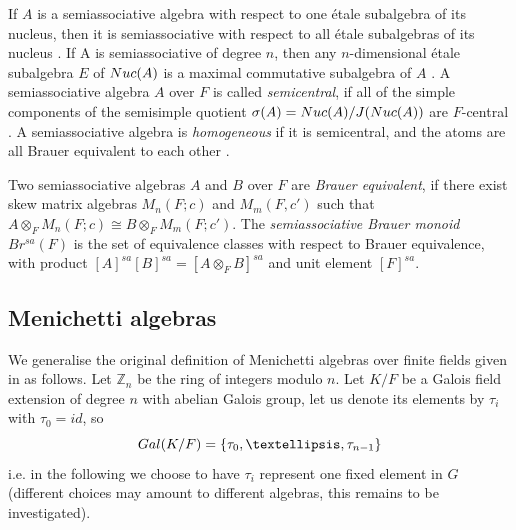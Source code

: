 \documentclass[11pt]{amsart}
\theoremstyle{plain}
\theoremstyle{definition}
\begin{document}
If $A$ is a
semiassociative algebra with respect to one \'etale subalgebra of its nucleus, then it is
 semiassociative
with respect to all \'etale subalgebras of its nucleus \cite[Proposition 3.6]{BHMRV}.
 If A is semiassociative of degree $n$, then any $n$-dimensional
\'etale subalgebra $E$ of ${\rm Nuc}(A)$ is a maximal commutative subalgebra of $A$ \cite[Corollary 7.3]{BHMRV}.
A semiassociative algebra $A$ over $F$ is called \emph{semicentral}, if all of the simple components of the semisimple quotient $\sigma(A)={\rm Nuc}(A)/J({\rm Nuc}(A))$ are $F$-central \cite[Definition 16.1]{BHMRV}.
 A semiassociative algebra is \emph{homogeneous} if it is
semicentral, and the atoms are all Brauer equivalent to each other \cite[Definition 17.2]{BHMRV}.

Two semiassociative algebras $A$ and $B$ over $F$ are  \emph{Brauer equivalent}, if there exist skew matrix algebras $M_n(F;c)$ and $M_m(F,c')$
such that $A\otimes_F M_n(F;c) \cong B \otimes_F M_m(F;c') $. The \emph{semiassociative Brauer monoid} $Br^{sa}(F)$ is the set of equivalence classes with respect to Brauer equivalence, with product $[A]^{sa}[B]^{sa}=[A\otimes_F B]^{sa}$ and unit element $[F]^{sa}$.





\subsection{Menichetti algebras}
We generalise the original definition of Menichetti algebras over finite fields given  in \cite{M} as follows.
Let $\mathbb{Z}_n$ be the ring of integers modulo $n$.  Let  $K/F$ be a Galois field extension  of degree $n$ with abelian Galois group, let us denote its elements by $\tau_i$ with $\tau_0=id$, so
$${\rm Gal}(K/F)=\{ \tau_0,\dots,\tau_{n-1} \}$$
i.e. in the following we choose to have $\tau_i$ represent one fixed element in $G$ (different choices may amount to different algebras, this remains to be investigated).
\end{document}
